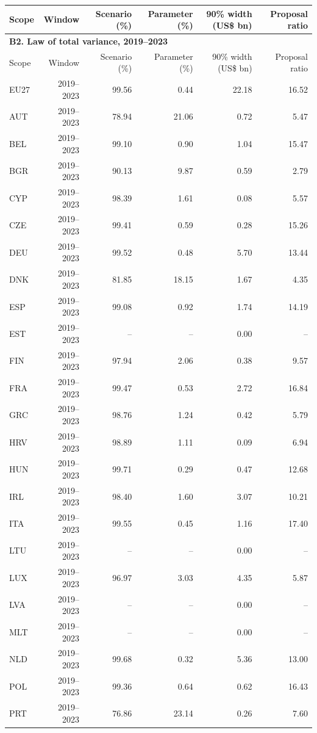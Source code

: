 {\begin{longtable}{@{}lrrrrr@{}}
\toprule
Scope & Window & Scenario (\%) & Parameter (\%) & 90\% width (US\$ bn) & Proposal ratio \\
\midrule
\endfirsthead
\multicolumn{6}{l}{\textbf{B2. Law of total variance, 2019–2023}} \\
\toprule
Scope & Window & Scenario (\%) & Parameter (\%) & 90\% width (US\$ bn) & Proposal ratio \\
\midrule
\endhead
\midrule
\endfoot
\bottomrule
\endlastfoot
EU27 & 2019–2023 & 99.56 &  0.44 & 22.18 & 16.52 \\
AUT & 2019–2023 & 78.94 & 21.06 &  0.72 &  5.47 \\
BEL & 2019–2023 & 99.10 &  0.90 &  1.04 & 15.47 \\
BGR & 2019–2023 & 90.13 &  9.87 &  0.59 &  2.79 \\
CYP & 2019–2023 & 98.39 &  1.61 &  0.08 &  5.57 \\
CZE & 2019–2023 & 99.41 &  0.59 &  0.28 & 15.26 \\
DEU & 2019–2023 & 99.52 &  0.48 &  5.70 & 13.44 \\
DNK & 2019–2023 & 81.85 & 18.15 &  1.67 &  4.35 \\
ESP & 2019–2023 & 99.08 &  0.92 &  1.74 & 14.19 \\
EST & 2019–2023 & -- & -- &  0.00 & -- \\
FIN & 2019–2023 & 97.94 &  2.06 &  0.38 &  9.57 \\
FRA & 2019–2023 & 99.47 &  0.53 &  2.72 & 16.84 \\
GRC & 2019–2023 & 98.76 &  1.24 &  0.42 &  5.79 \\
HRV & 2019–2023 & 98.89 &  1.11 &  0.09 &  6.94 \\
HUN & 2019–2023 & 99.71 &  0.29 &  0.47 & 12.68 \\
IRL & 2019–2023 & 98.40 &  1.60 &  3.07 & 10.21 \\
ITA & 2019–2023 & 99.55 &  0.45 &  1.16 & 17.40 \\
LTU & 2019–2023 & -- & -- &  0.00 & -- \\
LUX & 2019–2023 & 96.97 &  3.03 &  4.35 &  5.87 \\
LVA & 2019–2023 & -- & -- &  0.00 & -- \\
MLT & 2019–2023 & -- & -- &  0.00 & -- \\
NLD & 2019–2023 & 99.68 &  0.32 &  5.36 & 13.00 \\
POL & 2019–2023 & 99.36 &  0.64 &  0.62 & 16.43 \\
PRT & 2019–2023 & 76.86 & 23.14 &  0.26 &  7.60 \\

\end{longtable}}
